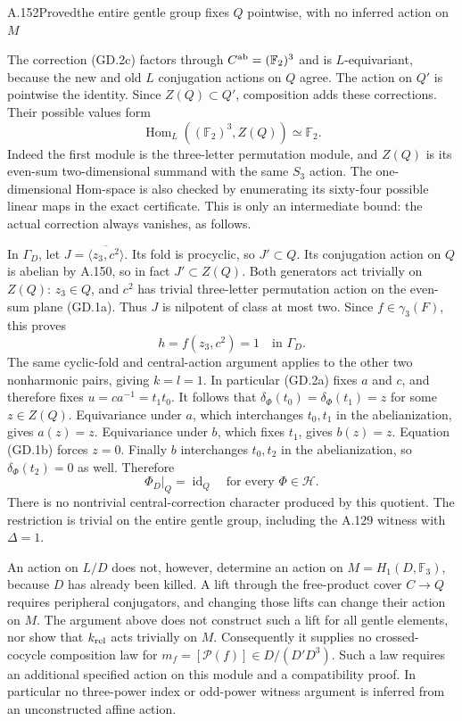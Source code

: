 \begin{statement}{A.152}{Proved}{the entire gentle group fixes $Q$ pointwise, with no inferred action on $M$}
\end{statement}
The correction (GD.2c) factors through
$C^{\rm ab}=(\mathbb F_2)^3$ and is $L$-equivariant,
because the new and old $L$ conjugation actions
on $Q$ agree. The action on $Q'$ is pointwise
the identity. Since $Z(Q)\subset Q'$, composition
adds these corrections. Their possible values form
\[
       \operatorname{Hom}_L((\mathbb F_2)^3,Z(Q))
                              \simeq\mathbb F_2.
 \tag{GD.3a}
\]
Indeed the first module is the three-letter
permutation module, and $Z(Q)$ is its even-sum
two-dimensional summand with the same $S_3$ action.
The one-dimensional Hom-space is also checked
by enumerating its sixty-four possible linear
maps in the exact certificate. This is only
an intermediate bound: the actual correction
always vanishes, as follows.

In $\Gamma_D$, let $J=\overline{\langle z_3,c^2\rangle}$.
Its fold is procyclic, so $J'\subset Q$.
Its conjugation action on $Q$ is abelian
by A.150, so in fact $J'\subset Z(Q)$.
Both generators act trivially on $Z(Q)$:
$z_3\in Q$, and $c^2$ has trivial
three-letter permutation action on the
even-sum plane (GD.1a). Thus $J$ is
nilpotent of class at most two. Since
$f\in\gamma_3(F)$, this proves
\[
                        h=f(z_3,c^2)=1
                         \quad\text{in }\Gamma_D.
\]
The same cyclic-fold and central-action
argument applies to the other two
nonharmonic pairs, giving $k=l=1$.
In particular (GD.2a) fixes $a$ and $c$,
and therefore fixes $u=ca^{-1}=t_1t_0$.
It follows that
$\delta_\Phi(t_0)=\delta_\Phi(t_1)=z$
for some $z\in Z(Q)$. Equivariance under
$a$, which interchanges $t_0,t_1$ in
the abelianization, gives $a(z)=z$.
Equivariance under $b$, which fixes
$t_1$, gives $b(z)=z$. Equation (GD.1b)
forces $z=0$. Finally $b$ interchanges
$t_0,t_2$ in the abelianization, so
$\delta_\Phi(t_2)=0$ as well. Therefore
\[
          \boxed{\ \Phi_D|_{Q}=\operatorname{id}_Q
                     \quad\text{for every }\Phi\in\mathcal H.\ }
 \tag{GD.3b}
\]
There is no nontrivial central-correction
character produced by this quotient.
The restriction is trivial on the entire
gentle group, including the A.129 witness
with $\Delta=1$.

An action on $L/D$ does not, however, determine
an action on $M=H_1(D,\mathbb F_3)$, because
$D$ has already been killed. A lift through
the free-product cover $C\to Q$ requires
peripheral conjugators, and changing those
lifts can change their action on $M$.
The argument above does not construct such
a lift for all gentle elements, nor show
that $k_{\rm rel}$ acts trivially on $M$.
Consequently it supplies no crossed-cocycle
composition law for
$m_f=[\mathcal P(f)]\in D/(D'D^3)$.
Such a law requires an additional specified
action on this module and a compatibility
proof. In particular no three-power index
or odd-power witness argument is inferred
from an unconstructed affine action.

